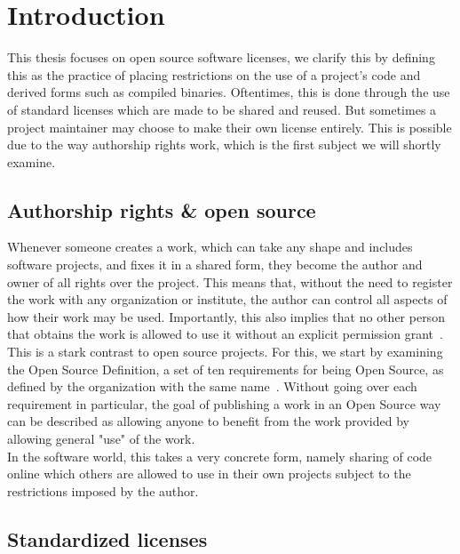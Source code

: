 
\chapter{Introduction}\label{ch:introduction}

This thesis focuses on open source software licenses, we clarify this by defining this as the practice of placing restrictions on the use of a project's code and derived forms such as compiled binaries. Oftentimes, this is done through the use of standard licenses which are made to be shared and reused. But sometimes a project maintainer may choose to make their own license entirely. This is possible due to the way authorship rights work, which is the first subject we will shortly examine.

\section{Authorship rights \& open source}

Whenever someone creates a work, which can take any shape and includes software projects, and fixes it in a shared form, they become the author and owner of all rights over the project. This means that, without the need to register the work with any organization or institute, the author can control all aspects of how their work may be used. Importantly, this also implies that no other person that obtains the work is allowed to use it without an explicit permission grant~\cite{us-copyright-law-definitions,eu-infosoc-directive,berne-convention}. \\

This is a stark contrast to open source projects. For this, we start by examining the Open Source Definition, a set of ten requirements for being Open Source, as defined by the organization with the same name~\cite{opensource-org-definition}. Without going over each requirement in particular, the goal of publishing a work in an Open Source way can be described as allowing anyone to benefit from the work provided by allowing general "use" of the work. \\

In the software world, this takes a very concrete form, namely sharing of code online which others are allowed to use in their own projects subject to the restrictions imposed by the author.

\section{Standardized licenses}

